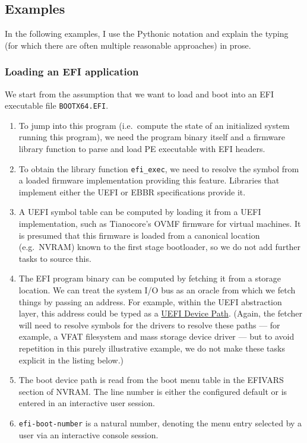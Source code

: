 \subsection{Examples}

In the following examples, I use the Pythonic notation and explain the typing (for which there are often multiple reasonable approaches) in prose.

\subsubsection{Loading an EFI application}

We start from the assumption that we want to load and boot into an EFI
executable file \texttt{BOOTX64.EFI}.

\begin{enumerate}
\def\labelenumi{\arabic{enumi}.}
\tightlist
\item
  To jump into this program (i.e.~compute the state of an initialized
  system running this program), we need the program binary itself and a
  firmware library function to parse and load PE executable with EFI
  headers.
\item
  To obtain the library function \texttt{efi\_exec}, we need to resolve
  the symbol from a loaded firmware implementation providing this
  feature. Libraries that implement either the UEFI or EBBR
  specifications provide it.
\item
  A UEFI symbol table can be computed by loading it from a UEFI
  implementation, such as Tianocore's OVMF firmware for virtual
  machines. It is presumed that this firmware is loaded from a canonical
  location (e.g.~NVRAM) known to the first stage bootloader, so we do
  not add further tasks to source this.
\item
  The EFI program binary can be computed by fetching it from a storage
  location. We can treat the system I/O bus as an oracle from which we
  fetch things by passing an address. For example, within the UEFI
  abstraction layer, this address could be typed as a
  \href{https://uefi.org/specs/UEFI/2.10/10_Protocols_Device_Path_Protocol.html}{UEFI
  Device Path}. (Again, the fetcher will need to resolve symbols for the
  drivers to resolve these paths --- for example, a VFAT filesystem and
  mass storage device driver --- but to avoid repetition in this purely
  illustrative example, we do not make these tasks explicit in the
  listing below.)
\item
  The boot device path is read from the boot menu table in the EFIVARS
  section of NVRAM. The line number is either the configured default or
  is entered in an interactive user session.
\item
  \texttt{efi-boot-number} is a natural number, denoting the menu entry
  selected by a user via an interactive console session.
\end{enumerate}


